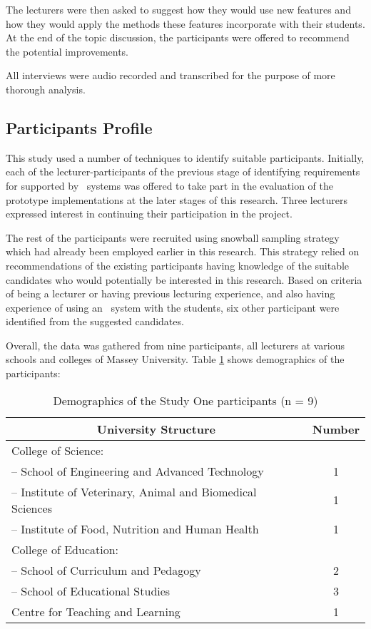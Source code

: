 The lecturers were then asked to suggest how they would use new features and how
they would apply the methods these features incorporate with their students. At
the end of the topic discussion, the participants were offered to recommend the
potential improvements.

All interviews were audio recorded and transcribed for the purpose of more
thorough analysis. 

\subsection{Participants Profile}

This study used a number of techniques to identify suitable participants.
Initially, each of the lecturer-participants of the previous stage of
identifying requirements for \LLLs supported by \ep~systems was offered to take
part in the evaluation of the prototype implementations at the later stages of
this research. Three lecturers expressed interest in continuing their
participation in the project.

The rest of the participants were recruited using snowball sampling strategy
which had already been employed earlier in this research. This strategy relied on
recommendations of the existing participants having knowledge of the suitable
candidates who would potentially be interested in this research. Based on
criteria of being a lecturer or having previous lecturing experience, and
also having experience of using an \ep~system with the students, six other
participant were identified from the suggested candidates.

Overall, the data was gathered from nine participants, all lecturers at
various schools and colleges of Massey University. Table \ref{tab:study1part}
shows demographics of the participants:

\begin{table}[htb]
  \begin{center}
    \begin{tabular}{| l | c |}
    \hline
     \multicolumn{1}{|c|}{\textbf{University Structure}} &
     \multicolumn{1}{c|}{\textbf{Number}} \\ \hline
		College of Science: & \\ 
		-- School of Engineering and Advanced Technology & 1 \\
		-- Institute of Veterinary, Animal and Biomedical Sciences & 1 \\
		-- Institute of Food, Nutrition and Human Health & 1 \\ \hline
		College of Education: & \\ 
		-- School of Curriculum and Pedagogy & 2 \\
		-- School of Educational Studies &  3 \\ \hline
		Centre for Teaching and Learning & 1 \\ \hline
	\end{tabular}
  \end{center}
\caption{Demographics of the Study One participants (n = 9)}
\label{tab:study1part}
\end{table}

